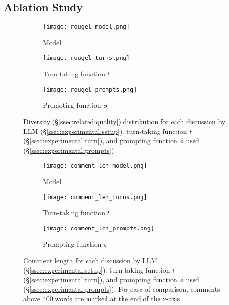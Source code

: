 \subsection{Ablation Study}
\label{ssec:results:ablation}

\begin{figure*}[t]
    \begin{subfigure}{0.32\linewidth}
        \texttt{[image: rougel\_model.png]}
        \caption{Model}
        \label{fig:rougel_model}
    \end{subfigure}%
    \hfill
    \begin{subfigure}{0.32\linewidth}
        \texttt{[image: rougel\_turns.png]}
        \caption{Turn-taking function $t$}
        \label{fig:rougel_turns}
    \end{subfigure}%
    \hfill
    \begin{subfigure}{0.32\linewidth}
        \texttt{[image: rougel\_prompts.png]}
        \caption{Promoting function $\phi$}
        \label{fig:rougel_prompts}
    \end{subfigure}%

    \caption{Diversity (\S\ref{ssec:related:quality}) distribution for each discussion by \ac{LLM} (\S\ref{ssec:experimental:setup}), turn-taking function $t$ (\S\ref{ssec:experimental:turn}), and prompting function $\phi$ used (\S\ref{ssec:experimental:prompts}).}
    \label{fig:diversity}
\end{figure*}

\begin{figure*}[t]
    \begin{subfigure}{0.32\linewidth}
        \texttt{[image: comment\_len\_model.png]}
        \caption{Model}
        \label{fig:comment_length_model}
    \end{subfigure}%
    \hfill
    \begin{subfigure}{0.32\linewidth}
        \texttt{[image: comment\_len\_turns.png]}
        \caption{Turn-taking function $t$}
        \label{fig:comment_length_turns}
    \end{subfigure}%
    \hfill
    \begin{subfigure}{0.32\linewidth}
        \texttt{[image: comment\_len\_prompts.png]}
        \caption{Prompting function $\phi$}
        \label{fig:comment_length_prompts}
    \end{subfigure}%

    \caption{Comment length for each discussion by \ac{LLM} (\S\ref{ssec:experimental:setup}), turn-taking function $t$ (\S\ref{ssec:experimental:turn}), and prompting function $\phi$ used (\S\ref{ssec:experimental:prompts}). For ease of comparison, comments above 400 words are marked at the end of the x-axis.}
    \label{fig:comment_length}
\end{figure*}


